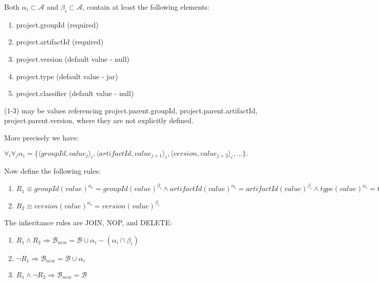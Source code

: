 \documentclass[12pt]{amsart}
\begin{document}
Both \begin{math}\alpha_i \subset \mathcal{A}\end{math} and \begin{math}\beta_i \subset \mathcal{A}\end{math}, contain at least the following elements:
\begin{enumerate}
\item project.groupId (required)
\item project.artifactId (required)
\item project.version (default value - null)
\item project.type (default value - jar)
\item project.classifier (default value - null)
\end{enumerate}

(1-3) may be values referencing project.parent.groupId, project.parent.artifactId, project.parent.version, where they are not explicitly defined.

More precisely we have:

\begin{math} \forall_i  \forall_j \alpha_i = \{\langle groupId, value_j \rangle_i, \langle artifactId, value_{j+1}\rangle_i, \langle version, value_{j+2}\rangle_i, \ldots\}.\end{math}

Now define the following rules:

\begin{enumerate}
\item 
 \begin{math} R_1 \equiv  
groupId(value)^{\alpha_i} = groupId(value)^{\beta_i}  \wedge artifactId(value)^{\alpha_i} = artifactId(value)^{\beta_i} \wedge type(value)^{\alpha_i} = type(value)^{\beta_i}  \wedge classifier(value)^{\alpha_i} = classifier(value)^{\beta_i} 
\end{math}
\item 
 \begin{math} R_2 \equiv  
version(value)^{\alpha_i} = version(value)^{\beta_i} 
\end{math}
\end{enumerate}


The inheritance rules are JOIN, NOP, and DELETE:

\begin{enumerate}
\item
\begin{math}
R_1 \wedge R_2 \Rightarrow \mathcal{B}_{new} = \mathcal{B} \cup \alpha_i - (\alpha_i \cap \beta_i)
\end{math}
\item
\begin{math}
\neg R_1\Rightarrow \mathcal{B}_{new} = \mathcal{B} \cup \alpha_i 
\end{math}
\item
\begin{math}
R_1 \wedge \neg R_2 \Rightarrow \mathcal{B}_{new} = \mathcal{B} \end{math}
\end{enumerate}
\end{document}
